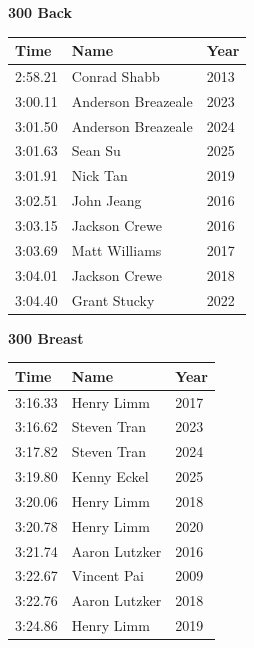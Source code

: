 \vspace{1.2em}
\noindent\begin{minipage}[t]{0.48\textwidth}
\centering
\textbf{\textcolor{teamprimary}{300 Back}}\par
\vspace{0.5em}
\centering
\small
\renewcommand{\arraystretch}{1.0}
\setlength{\tabcolsep}{4pt}
\begin{tabular}{@{}p{1.8cm}p{3.0cm}p{1.0cm}@{}}
\toprule
\textbf{Time} & \textbf{Name} & \textbf{Year} \\
\midrule
2:58.21 & Conrad Shabb & 2013 \\
3:00.11 & Anderson Breazeale & 2023 \\
3:01.50 & Anderson Breazeale & 2024 \\
3:01.63 & Sean Su & 2025 \\
3:01.91 & Nick Tan & 2019 \\
3:02.51 & John Jeang & 2016 \\
3:03.15 & Jackson Crewe & 2016 \\
3:03.69 & Matt Williams & 2017 \\
3:04.01 & Jackson Crewe & 2018 \\
3:04.40 & Grant Stucky & 2022 \\
\bottomrule
\end{tabular}
\end{minipage}
\hfill
\begin{minipage}[t]{0.48\textwidth}
\centering
\textbf{\textcolor{teamprimary}{300 Breast}}\par
\vspace{0.5em}
\centering
\small
\renewcommand{\arraystretch}{1.0}
\setlength{\tabcolsep}{4pt}
\begin{tabular}{@{}p{1.8cm}p{3.0cm}p{1.0cm}@{}}
\toprule
\textbf{Time} & \textbf{Name} & \textbf{Year} \\
\midrule
3:16.33 & Henry Limm & 2017 \\
3:16.62 & Steven Tran & 2023 \\
3:17.82 & Steven Tran & 2024 \\
3:19.80 & Kenny Eckel & 2025 \\
3:20.06 & Henry Limm & 2018 \\
3:20.78 & Henry Limm & 2020 \\
3:21.74 & Aaron Lutzker & 2016 \\
3:22.67 & Vincent Pai & 2009 \\
3:22.76 & Aaron Lutzker & 2018 \\
3:24.86 & Henry Limm & 2019 \\
\bottomrule
\end{tabular}
\end{minipage}
